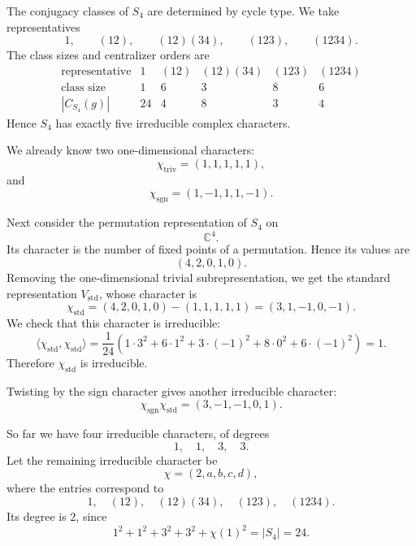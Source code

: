\begin{example}
    The conjugacy classes of \(S_4\) are determined by cycle type. We take
    representatives
    \[
        1,\qquad
        (12),\qquad
        (12)(34),\qquad
        (123),\qquad
        (1234).
    \]
    The class sizes and centralizer orders are
    \[
        \begin{array}{c|ccccc}
            \text{representative}
            & 1 & (12) & (12)(34) & (123) & (1234)\\
            \hline
            \text{class size}
            & 1 & 6 & 3 & 8 & 6\\
            |C_{S_4}(g)|
            & 24 & 4 & 8 & 3 & 4
        \end{array}
    \]
    Hence \(S_4\) has exactly five irreducible complex characters.

    We already know two one-dimensional characters:
    \[
        \chi_{\mathrm{triv}}
        =
        (1,1,1,1,1),
    \]
    and
    \[
        \chi_{\mathrm{sgn}}
        =
        (1,-1,1,1,-1).
    \]

    Next consider the permutation representation of \(S_4\) on
    \[
        \mathbb{C}^4.
    \]
    Its character is the number of fixed points of a permutation. Hence its
    values are
    \[
        (4,2,0,1,0).
    \]
    Removing the one-dimensional trivial subrepresentation, we get the standard
    representation \(V_{\mathrm{std}}\), whose character is
    \[
        \chi_{\mathrm{std}}
        =
        (4,2,0,1,0)-(1,1,1,1,1)
        =
        (3,1,-1,0,-1).
    \]
    We check that this character is irreducible:
    \[
        \langle \chi_{\mathrm{std}},\chi_{\mathrm{std}}\rangle
        =
        \frac{1}{24}
        \left(
            1\cdot 3^2
            +
            6\cdot 1^2
            +
            3\cdot (-1)^2
            +
            8\cdot 0^2
            +
            6\cdot (-1)^2
        \right)
        =
        1.
    \]
    Therefore \(\chi_{\mathrm{std}}\) is irreducible.

    Twisting by the sign character gives another irreducible character:
    \[
        \chi_{\mathrm{sgn}}\chi_{\mathrm{std}}
        =
        (3,-1,-1,0,1).
    \]

    So far we have four irreducible characters, of degrees
    \[
        1,\quad 1,\quad 3,\quad 3.
    \]
    Let the remaining irreducible character be
    \[
        \chi=(2,a,b,c,d),
    \]
    where the entries correspond to
    \[
        1,\quad (12),\quad (12)(34),\quad (123),\quad (1234).
    \]
    Its degree is \(2\), since
    \[
        1^2+1^2+3^2+3^2+\chi(1)^2
        =
        |S_4|
        =
        24.
    \]


\end{example}
